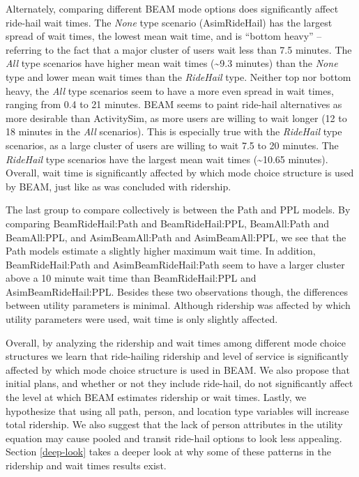 \documentclass[fancy, masters]{byuthesis}
\begin{document}
Alternately, comparing different BEAM mode options does significantly affect ride-hail wait times. The \emph{None} type scenario (AsimRideHail) has the largest spread of wait times, the lowest mean wait time, and is ``bottom heavy'' -- referring to the fact that a major cluster of users wait less than 7.5 minutes. The \emph{All} type scenarios have higher mean wait times (\textasciitilde9.3 minutes) than the \emph{None} type and lower mean wait times than the \emph{RideHail} type. Neither top nor bottom heavy, the \emph{All} type scenarios seem to have a more even spread in wait times, ranging from 0.4 to 21 minutes. BEAM seems to paint ride-hail alternatives as more desirable than ActivitySim, as more users are willing to wait longer (12 to 18 minutes in the \emph{All} scenarios). This is especially true with the \emph{RideHail} type scenarios, as a large cluster of users are willing to wait 7.5 to 20 minutes. The \emph{RideHail} type scenarios have the largest mean wait times (\textasciitilde10.65 minutes). Overall, wait time is significantly affected by which mode choice structure is used by BEAM, just like as was concluded with ridership.

The last group to compare collectively is between the Path and PPL models. By comparing BeamRideHail:Path and BeamRideHail:PPL, BeamAll:Path and BeamAll:PPL, and AsimBeamAll:Path and AsimBeamAll:PPL, we see that the Path models estimate a slightly higher maximum wait time. In addition, BeamRideHail:Path and AsimBeamRideHail:Path seem to have a larger cluster above a 10 minute wait time than BeamRideHail:PPL and AsimBeamRideHail:PPL. Besides these two observations though, the differences between utility parameters is minimal. Although ridership was affected by which utility parameters were used, wait time is only slightly affected.

Overall, by analyzing the ridership and wait times among different mode choice structures we learn that ride-hailing ridership and level of service is significantly affected by which mode choice structure is used in BEAM. We also propose that initial plans, and whether or not they include ride-hail, do not significantly affect the level at which BEAM estimates ridership or wait times. Lastly, we hypothesize that using all path, person, and location type variables will increase total ridership. We also suggest that the lack of person attributes in the utility equation may cause pooled and transit ride-hail options to look less appealing. Section \ref{deep-look} takes a deeper look at why some of these patterns in the ridership and wait times results exist.
\end{document}
